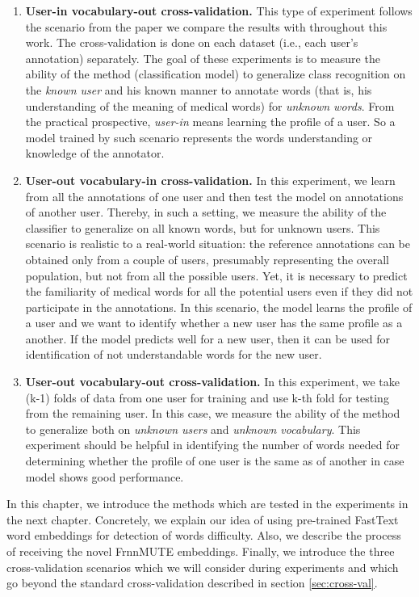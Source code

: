 \begin{enumerate}
    \item \textbf{User-in vocabulary-out cross-validation.} This type of experiment follows the scenario from the paper \citep{Grabar-PITR2014} we compare the results with throughout this work.  The cross-validation is done on each dataset (i.e., each user's annotation) separately. The goal of these experiments is to measure the ability of the method (classification model) to generalize class recognition on the \textit{known user} and his known manner to annotate words (that is, his understanding of the meaning of medical words) for \textit{unknown words}.  From the practical prospective, \textit{user-in} means learning the profile of a user. So a model trained by such scenario represents the words understanding or knowledge of the annotator.
      
    \item \textbf{User-out vocabulary-in cross-validation.} In this experiment, we learn from all the annotations of one user and then test the model on annotations of another user. Thereby, in such a setting, we measure the ability of the classifier to generalize on all known words, but for unknown users. This scenario is realistic to a real-world situation: the reference annotations can be obtained only from a couple of users, presumably representing the overall population, but not from all the possible users. Yet, it is necessary to predict the familiarity of medical words for all the potential users even if they did not participate in the annotations. In this scenario, the model learns the profile of a
  user and we want to identify whether a new user has the same
  profile as a another. If the model predicts well for a new user, then it can be used for identification of not understandable words for the new user. 
      
    \item \textbf{User-out vocabulary-out cross-validation.} In this experiment, we take (k-1) folds of data from one user for training and use k-th fold for testing from the remaining user. In this case, we measure the ability of the method to generalize both on \textit{unknown users} and \textit{ unknown vocabulary}. This experiment should be helpful in identifying the number of words needed for determining whether the profile of one user is the same as of another in case model shows good performance.
\end{enumerate}

\bigskip
In this chapter, we introduce the methods which are tested in the experiments in the next chapter. Concretely, we explain our idea of using pre-trained FastText word embeddings for detection of words difficulty. Also, we describe the process of receiving the novel FrnnMUTE embeddings. Finally, we introduce the three cross-validation scenarios which we will consider during experiments and which go beyond the standard cross-validation described in section \ref{sec:cross-val}. 